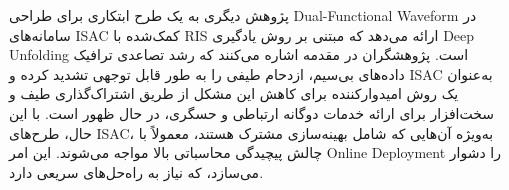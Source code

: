 \begin{comment}
​
). این امر منجر به قید شدیدتر D(P 
0
​
∥P 
1
​
)≤2ϵ 
2
می‌شود. از آنجایی که PTx و Alice فقط اطلاعات وضعیت کانال آماری (statistical CSI) ویلی را می‌دانند (که یک سناریوی کاربردی واقعی‌تر است)، انتظار از D(P 
0
​
∥P 
1
​
) به عنوان معیار پنهان‌کاری استفاده می‌شود . برای تقریب این مقدار مورد انتظار، از تقریب میانگین نمونه (SAA) در یک مینی-بچ از نمونه‌های کانال استفاده می‌شود .
3. باز کردن الگوریتم گرادیان نزولی: الگوریتم گرادیان نزولی (GD) به عنوان بنیان برای الگوریتم DUAGD انتخاب می‌شود. تکرارهای GD برای به‌روزرسانی f، Φ و ضرایب لاگرانژ λ 
1
​
و λ 
2
​
به یک ساختار شبکه‌ی چندلایه باز می‌شوند . در این فرآیند باز کردن، اندازه‌های گام ثابت GD (μ) با مجموعه‌ای از پارامترهای قابل آموزش (μ 
k
) و پارامترهای آفست (q 
k
) در هر لایه (k) جایگزین می‌شوند تا درجه آزادی شبکه افزایش یابد . این ساختار تضمین می‌کند که قیود توان حداکثر PTx، قید مدول واحد RIS و قید عدم منفی بودن ضرایب لاگرانژ در پایان هر لایه اعمال می‌شوند .
نتایج شبیه‌سازی نشان می‌دهد که الگوریتم DUAGD پیشنهادی سرعت همگرایی سریع‌تری نسبت به الگوریتم‌های تکراری مرسوم و الگوریتم‌های صرفاً مبتنی بر یادگیری مانند
\gls{Deep Neural Network}
 (که در این مقاله OADNN نامیده می‌شود) دارد و در عین حال عملکرد نرخ قابل دستیابی (achievable rate) را حفظ می‌کند . همچنین، مشخص شد که DUAGD نسبت به OADNN و سیاست شکل‌دهی پرتو تصادفی، نرخ حداکثر بالاتری دارد و عملکرد آن با افزایش تعداد عناصر بازتابنده RIS افزایش می‌یابد، که نشان‌دهنده اثربخشی بهینه‌سازی مشترک شکل‌دهی پرتو فعال و غیرفعال است . از نظر پیچیدگی محاسباتی نیز، DUAGD به دلیل ثابت بودن تعداد لایه‌ها (K) که کمتر از تعداد تکرارهای مورد نیاز GD (T) برای همگرایی است (K≪T)، پیچیدگی کمتری نسبت به الگوریتم تکراری GD دارد.
به طور کلی، این مقاله یک راهکار کارآمد، مدل-محور و مقاوم در برابر عدم قطعیت CSI آماری (از طریق استفاده از SAA) برای طراحی شکل‌دهی پرتو در یک سیستم پیچیده SR پنهان که توسط RIS کمک می‌شود، ارائه می‌دهد
\cite{JointActive}.
\end{comment}


پژوهش دیگری به یک طرح ابتکاری برای طراحی 
\gls{Dual-Functional Waveform}
 در سامانه‌های 
\gls{ISAC}
  کمک‌شده با 
\gls{RIS}
   ارائه می‌دهد که مبتنی بر روش یادگیری 
\gls{Deep Unfolding}
    است.
پژوهشگران در مقدمه اشاره می‌کنند که رشد تصاعدی ترافیک داده‌های بی‌سیم، ازدحام طیفی را به طور قابل توجهی تشدید کرده و 
\gls{ISAC}
 به‌عنوان یک روش امیدوارکننده برای کاهش این مشکل از طریق اشتراک‌گذاری طیف و سخت‌افزار برای ارائه خدمات دوگانه ارتباطی و حسگری، در حال ظهور است. با این حال، طرح‌های 
\gls{ISAC}،
  به‌ویژه آن‌هایی که شامل بهینه‌سازی مشترک هستند، معمولاً با چالش پیچیدگی محاسباتی بالا مواجه می‌شوند. این امر 
\gls{Online Deployment}
   را دشوار می‌سازد، که نیاز به راه‌حل‌های سریعی دارد.
   
